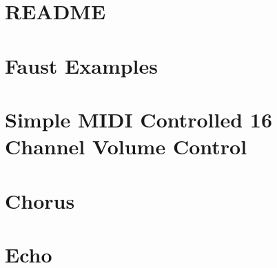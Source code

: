 \let\mypdfximage\pdfximage\def\pdfximage{\immediate\mypdfximage}\documentclass[twoside]{book}
\newcommand{\+}{\discretionary{\mbox{\scriptsize$\hookleftarrow$}}{}{}}
\begin{document}
\chapter{R\+E\+A\+D\+ME}
\label{md__c_1__users_fab_src__github_branches__neural_amp_modeler_plugin_i_plug2__dependencies__build_58fdc0f74c7246720d59d28ec9df2850}

\chapter{Faust Examples}
\label{md__c_1__users_fab_src__github_branches__neural_amp_modeler_plugin_i_plug2__dependencies__build_a76c7ba2d453dde5fefc311938a5da1f}

\chapter{Simple M\+I\+DI Controlled 16 Channel Volume Control}
\label{md__c_1__users_fab_src__github_branches__neural_amp_modeler_plugin_i_plug2__dependencies__build_4694596fa010f57254533d7df8443201}

\chapter{Chorus}
\label{md__c_1__users_fab_src__github_branches__neural_amp_modeler_plugin_i_plug2__dependencies__build_bc424e937afd0997061756335d9df68f}

\chapter{Echo}
\label{md__c_1__users_fab_src__github_branches__neural_amp_modeler_plugin_i_plug2__dependencies__build_6762fc29b26a4632822a5c2b2a049cab}

\end{document}
